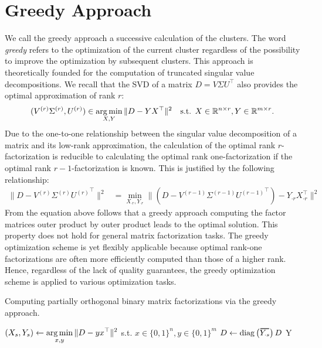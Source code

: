 \section{Greedy Approach}\label{sec:ZS:GreedyApproach}
We call the greedy approach a successive calculation of the clusters. The word \emph{greedy} refers to the optimization of the current cluster regardless of the possibility to improve the optimization by subsequent clusters. This approach is theoretically founded for the computation of truncated singular value decompositions. 
We recall that the SVD of a matrix $D=V\Sigma U^\top$ also provides the optimal approximation of rank $r$:
\begin{align*}
     (V^{(r)}\Sigma^{(r)},U^{(r)})&\in\operatorname*{arg\,min}_{X,Y}\|D-YX^\top\|^2 &\text{s.t. } X\in\mathbb{R}^{n\times r}, Y\in\mathbb{R}^{m\times r}.
\end{align*}
Due to the one-to-one relationship between the singular value decomposition of a matrix and its low-rank approximation, the calculation of the optimal rank $r$-factorization is reducible to calculating the optimal rank one-factorization if the optimal rank $r-1$-factorization is known. This is justified by the following relationship:  
\begin{align*}
\|D-V^{(r)}\Sigma^{(r)}{U^{(r)}}^\top\|^2
     &= \min_{X_{\cdot r},Y_{\cdot r}} \|(D-V^{(r-1)}\Sigma^{(r-1)}{U^{(r-1)}}^\top)-Y_{\cdot r}X_{\cdot r}^\top\|^2
\end{align*}
From the equation above follows that a greedy approach computing the factor matrices outer product by outer product leads to the optimal solution. This property does not hold for general matrix factorization tasks. The greedy optimization scheme is yet flexibly applicable because optimal rank-one factorizations are often more efficiently computed than those of a higher rank. Hence, regardless of the lack  of quality guarantees, the greedy optimization scheme is applied to various optimization tasks.
\begin{algorithm}[t]
\caption{Computing partially orthogonal binary matrix factorizations via the greedy approach.} 
\begin{algorithmic}[1]
    	\State $\displaystyle(X_s,Y_s)\gets \operatorname*{arg\,min}_{x,y} \|D-yx^\top\|^2 $ \hfill s.t. $x\in\{0,1\}^n,y\in\{0,1\}^m$
    	\label{alg:greedy:opt}
    	\State $D\gets \diag\left(\thickbar{Y_{\cdot s}}\right)D$ \label{alg:greedy:reduce}
    \EndFor
    \State \Return Y
  \EndFunction
\end{algorithmic}
\label{alg:greedy}
\end{algorithm}

